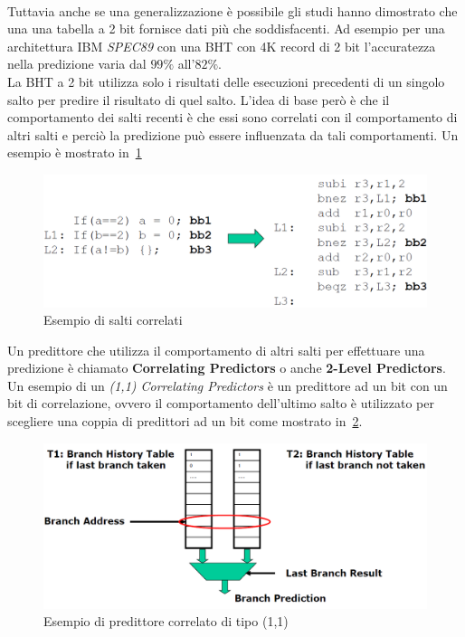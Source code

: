 \\ Tuttavia anche se una generalizzazione è possibile gli studi hanno dimostrato che una una tabella a 2 bit fornisce dati più che soddisfacenti. Ad esempio per una architettura IBM \emph{SPEC89} con una BHT con 4K record di 2 bit l'accuratezza nella predizione varia dal $99\%$ all'$82\%$.\\
La BHT a 2 bit utilizza solo i risultati delle esecuzioni precedenti di un singolo salto per predire il risultato di quel salto. L'idea di base però è che il comportamento dei salti recenti è che essi sono correlati con il comportamento di altri salti e perciò la predizione può essere influenzata da tali comportamenti. Un esempio è mostrato in \figurename\,\ref{fig:correletedbranch}
\begin{figure}[htb]
\centering
\includegraphics[scale=0.5]{img/correleted.png}
\caption{Esempio di salti correlati}\label{fig:correletedbranch}
\end{figure}
Un predittore che utilizza il comportamento di altri salti per effettuare una predizione è chiamato \textbf{Correlating  Predictors} o anche \textbf{2-Level Predictors}.
Un esempio di un \emph{(1,1) Correlating Predictors} è un predittore ad un bit con un bit di correlazione, ovvero il comportamento dell'ultimo salto è utilizzato per scegliere una coppia di predittori ad un bit come mostrato in \figurename\,\ref{fig:11correlato}.
\begin{figure}
\centering
\includegraphics[scale=0.5]{img/11correlato.png}
\caption{Esempio di predittore correlato di tipo (1,1)}\label{fig:11correlato}
\end{figure}
